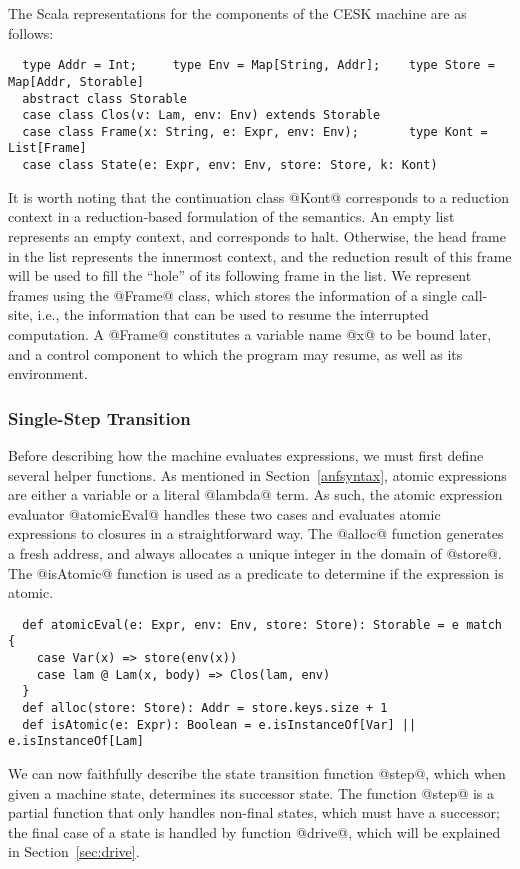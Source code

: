 \documentclass[acmsmall, screen]{acmart}\settopmatter{}
\begin{document}
The Scala representations for the components of the CESK machine are as follows:

\begin{lstlisting}
  type Addr = Int;     type Env = Map[String, Addr];    type Store = Map[Addr, Storable]
  abstract class Storable
  case class Clos(v: Lam, env: Env) extends Storable
  case class Frame(x: String, e: Expr, env: Env);       type Kont = List[Frame]
  case class State(e: Expr, env: Env, store: Store, k: Kont)
\end{lstlisting}

It is worth noting that the continuation class @Kont@ corresponds to a reduction
context in a reduction-based formulation of the semantics.
An empty list represents an empty context, and corresponds to halt. Otherwise, the head
frame in the list represents the innermost context, and the reduction result of this
frame will be used to fill the ``hole'' of its following frame in the list.
We represent frames using the @Frame@ class, which stores the information of a single
call-site, i.e., the information that can be used to resume the interrupted computation.
A @Frame@ constitutes a variable name @x@ to be bound later, and a control component
to which the program may resume, as well as its environment.

\subsubsection{Single-Step Transition}
Before describing how the machine evaluates expressions, we must first define several helper
functions. As mentioned in Section~\ref{anfsyntax}, atomic expressions are either a variable
or a literal @lambda@ term. As such, the atomic expression evaluator @atomicEval@ handles
these two cases and evaluates atomic expressions to closures in a straightforward way.
The @alloc@ function generates a fresh address, and always allocates a unique integer
in the domain of @store@.
The @isAtomic@ function is used as a predicate to determine if the expression is atomic.

\begin{lstlisting}
  def atomicEval(e: Expr, env: Env, store: Store): Storable = e match {
    case Var(x) => store(env(x))
    case lam @ Lam(x, body) => Clos(lam, env)
  }
  def alloc(store: Store): Addr = store.keys.size + 1
  def isAtomic(e: Expr): Boolean = e.isInstanceOf[Var] || e.isInstanceOf[Lam]
\end{lstlisting}

We can now faithfully describe the state transition function @step@,
which when given a machine state, determines its successor state.
The function @step@ is a partial function that only handles non-final states,
which must have a successor; the final case of a state is handled by function
@drive@, which will be explained in Section~\ref{sec:drive}.
\end{document}

